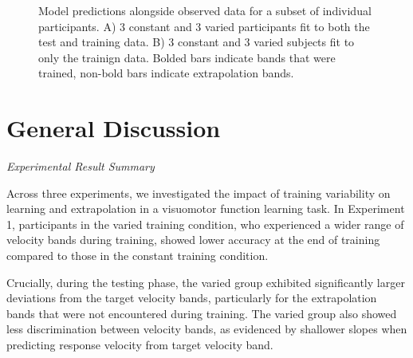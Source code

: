 \documentclass[
  12pt,
  letterpaper,
]{article}
\begin{document}
\begin{figure}


\caption{\label{fig-htw-indv-pred}Model predictions alongside observed
data for a subset of individual participants. A) 3 constant and 3 varied
participants fit to both the test and training data. B) 3 constant and 3
varied subjects fit to only the trainign data. Bolded bars indicate
bands that were trained, non-bold bars indicate extrapolation bands.}

\end{figure}%

\section{General Discussion}\label{general-discussion-1}

\emph{Experimental Result Summary}

Across three experiments, we investigated the impact of training
variability on learning and extrapolation in a visuomotor function
learning task. In Experiment 1, participants in the varied training
condition, who experienced a wider range of velocity bands during
training, showed lower accuracy at the end of training compared to those
in the constant training condition.

Crucially, during the testing phase, the varied group exhibited
significantly larger deviations from the target velocity bands,
particularly for the extrapolation bands that were not encountered
during training. The varied group also showed less discrimination
between velocity bands, as evidenced by shallower slopes when predicting
response velocity from target velocity band.
\end{document}

